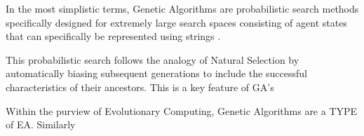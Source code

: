 In the most simplistic terms, Genetic Algorithms are probabilistic search methods specifically designed for extremely large search spaces consisting of agent states that can specifically be represented using strings \cite{goldberg1988genetic}.



This probabilistic search follows the analogy of Natural Selection by automatically biasing subsequent generations to include the successful characteristics of their ancestors. This is a key feature of GA's 








Within the purview of Evolutionary Computing, Genetic Algorithms are a TYPE of EA. Similarly

